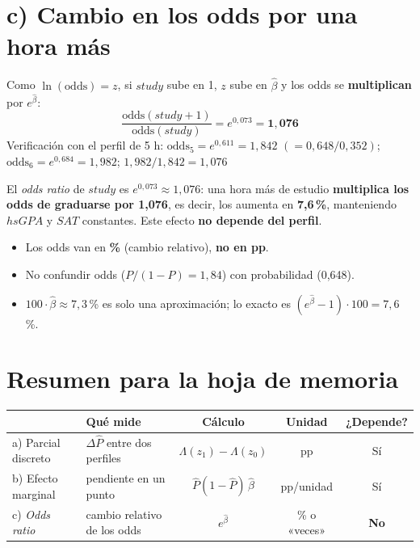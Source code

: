 \documentclass[11pt,a4paper]{article}
\begin{document}
\section*{c) Cambio en los odds por una hora más}
Como $\ln(\text{odds})=z$, si $study$ sube en 1, $z$ sube en $\hat\beta$ y los odds se \textbf{multiplican} por $e^{\hat\beta}$:
\[
\frac{\text{odds}(study+1)}{\text{odds}(study)}=e^{0{,}073}=\mathbf{1{,}076}
\]
Verificación con el perfil de 5 h: $\text{odds}_5=e^{0{,}611}=1{,}842$ $(=0{,}648/0{,}352)$; $\text{odds}_6=e^{0{,}684}=1{,}982$; $1{,}982/1{,}842=1{,}076$ \checkmark
\begin{ejemplar}
El \emph{odds ratio} de $study$ es $e^{0{,}073}\approx1{,}076$: una hora más de estudio \textbf{multiplica los odds de graduarse por 1,076}, es decir, los aumenta en \textbf{7,6\,\%}, manteniendo $hsGPA$ y $SAT$ constantes. Este efecto \textbf{no depende del perfil}.
\end{ejemplar}
\begin{trampa}
\begin{itemize}[leftmargin=*,itemsep=0pt,topsep=0pt]
\item Los odds van en \textbf{\%} (cambio relativo), \textbf{no en pp}.
\item No confundir odds ($P/(1-P)=1{,}84$) con probabilidad (0,648).
\item $100\cdot\hat\beta\approx7{,}3$\,\% es solo una aproximación; lo exacto es $(e^{\hat\beta}-1)\cdot100=7{,}6$\,\%.
\end{itemize}
\end{trampa}

\section*{Resumen para la hoja de memoria}
\begin{center}
\renewcommand{\arraystretch}{1.4}
\begin{tabular}{llccc}\toprule
 & Qué mide & Cálculo & Unidad & ¿Depende?\\\midrule
a) Parcial discreto & $\Delta\hat P$ entre dos perfiles & $\Lambda(z_1)-\Lambda(z_0)$ & pp & Sí\\
b) Efecto marginal & pendiente en un punto & $\hat P(1-\hat P)\,\hat\beta$ & pp/unidad & Sí\\
c) \emph{Odds ratio} & cambio relativo de los odds & $e^{\hat\beta}$ & \% o «veces» & \textbf{No}\\\bottomrule
\end{tabular}
\end{center}
\end{document}
